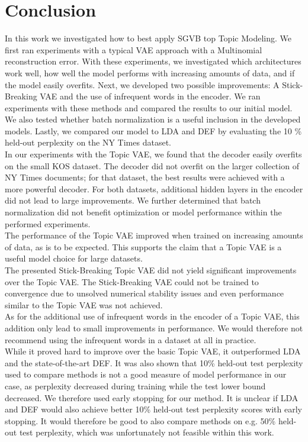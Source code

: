 \documentclass{report}
\begin{document}
	


	




		
\chapter{Conclusion}
In this work we investigated how to best apply SGVB top Topic Modeling. We first ran experiments with a typical VAE approach with a Multinomial reconstruction error. With these experiments, we investigated which architectures work well, how well the model performs with increasing amounts of data, and if the model easily overfits. Next, we developed two possible improvements: A Stick-Breaking VAE and the use of infrequent words in the encoder. We ran experiments with these methods and compared the results to our initial model. We also tested whether batch normalization is a useful inclusion in the developed models. Lastly, we compared our model to LDA and DEF by evaluating the 10 \% held-out perplexity on the NY Times dataset.\\
In our experiments with the Topic VAE, we found that the decoder easily overfits on the small KOS dataset. The decoder did not overfit on the larger collection of NY Times documents; for that dataset, the best results were achieved with a more powerful decoder. For both datasets, additional hidden layers in the encoder did not lead to large improvements. We further determined that batch normalization did not benefit optimization or model performance within the performed experiments. \\
The performance of the Topic VAE improved when trained on increasing amounts of data, as is to be expected. This supports the claim that a Topic VAE is a useful model choice for large datasets.\\
The presented Stick-Breaking Topic VAE did not yield significant improvements over the Topic VAE. The Stick-Breaking VAE could not be trained to convergence due to unsolved numerical stability issues and even  performance similar to the Topic VAE was not achieved. \\
As for the additional use of infrequent words in the encoder of a Topic VAE, this addition only lead to small improvements in performance. We would therefore not recommend using the infrequent words in a dataset at all in practice. \\
While it proved hard to improve over the basic Topic VAE, it outperformed LDA and the state-of-the-art DEF. It was also shown that 10\% held-out test perplexity used to compare methods is not a good measure of model performance in our case, as perplexity decreased during training while the test lower bound decreased. We therefore used early stopping for our method. It is unclear if LDA and DEF would also achieve better 10\% held-out test perplexity scores with early stopping. It would therefore be good to also compare methods on e.g. 50\% held-out test perplexity, which was unfortunately not feasible within this work.\\
\end{document}
